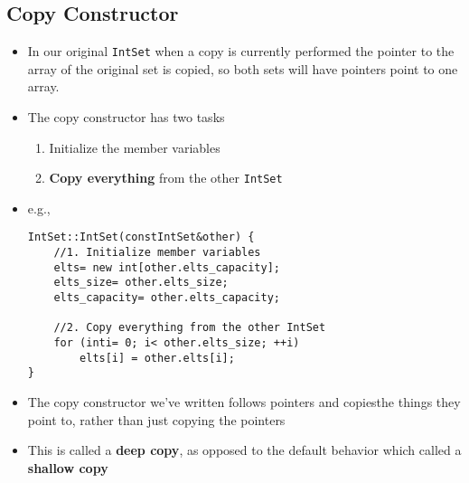 \subsection{Copy Constructor}
\begin{itemize}
	\item In our original \lstinline[style=C++]{IntSet} when a copy is currently performed the pointer to the array of the original set is copied, so both sets will have pointers point to one array. 
	\item The copy constructor has two tasks
	\begin{enumerate}
		\item Initialize the member variables
		\item \textbf{Copy everything} from the other \lstinline[style=C++]{IntSet}
	\end{enumerate}
	\item e.g.,
\begin{lstlisting}[style=C++]
IntSet::IntSet(constIntSet&other) {
	//1. Initialize member variables
	elts= new int[other.elts_capacity];
	elts_size= other.elts_size;
	elts_capacity= other.elts_capacity;

	//2. Copy everything from the other IntSet
	for (inti= 0; i< other.elts_size; ++i)
		elts[i] = other.elts[i];
}
\end{lstlisting}
	\item The copy constructor we've written follows pointers and copiesthe things they point to, rather than just copying the pointers
	\item This is called a \textbf{deep copy}, as opposed to the default behavior which called a \textbf{shallow copy}
\end{itemize}

